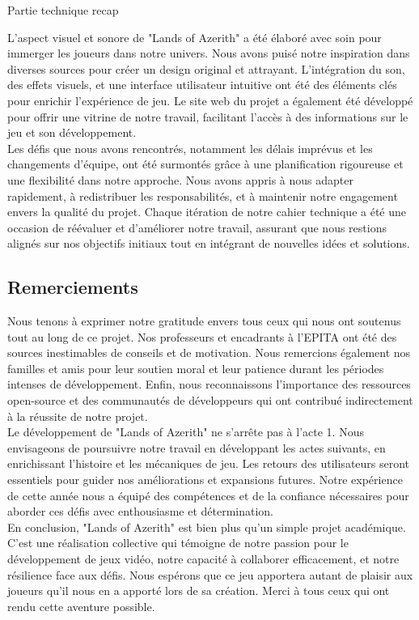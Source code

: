 Partie technique recap

L'aspect visuel et sonore de "Lands of Azerith" a été élaboré avec soin pour immerger les joueurs dans notre univers.
Nous avons puisé notre inspiration dans diverses sources pour créer un design original et attrayant.
L'intégration du son, des effets visuels, et une interface utilisateur intuitive ont été des éléments clés pour enrichir l'expérience de jeu.
Le site web du projet a également été développé pour offrir une vitrine de notre travail, facilitant l'accès à des informations sur le jeu et son développement.
\\

Les défis que nous avons rencontrés, notamment les délais imprévus et les changements d'équipe, ont été surmontés grâce à une planification rigoureuse
et une flexibilité dans notre approche. Nous avons appris à nous adapter rapidement, à redistribuer les responsabilités, et à maintenir notre engagement
envers la qualité du projet. Chaque itération de notre cahier technique a été une occasion de réévaluer et d'améliorer notre travail, assurant que nous
restions alignés sur nos objectifs initiaux tout en intégrant de nouvelles idées et solutions.
\\

\subsection{Remerciements}

Nous tenons à exprimer notre gratitude envers tous ceux qui nous ont soutenus tout au long de ce projet.
Nos professeurs et encadrants à l'EPITA ont été des sources inestimables de conseils et de motivation.
Nous remercions également nos familles et amis pour leur soutien moral et leur patience durant les périodes intenses de développement.
Enfin, nous reconnaissons l'importance des ressources open-source et des communautés de développeurs qui ont contribué indirectement à la réussite de notre projet.
\\

Le développement de "Lands of Azerith" ne s'arrête pas à l'acte 1.
Nous envisageons de poursuivre notre travail en développant les actes suivants, en enrichissant l'histoire et les mécaniques de jeu. 
Les retours des utilisateurs seront essentiels pour guider nos améliorations et expansions futures. 
Notre expérience de cette année nous a équipé des compétences et de la confiance nécessaires pour aborder ces défis avec enthousiasme et détermination.
\\

En conclusion, "Lands of Azerith" est bien plus qu'un simple projet académique. C'est une réalisation collective qui témoigne de notre passion pour le développement de jeux vidéo, notre capacité à collaborer efficacement, et notre résilience face aux défis. Nous espérons que ce jeu apportera autant de plaisir aux joueurs qu'il nous en a apporté lors de sa création. Merci à tous ceux qui ont rendu cette aventure possible.
